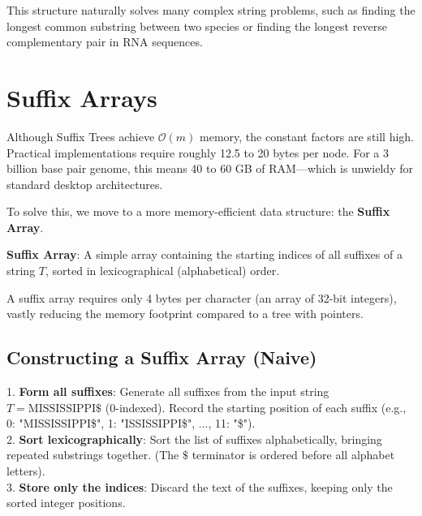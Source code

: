 This structure naturally solves many complex string problems, such as finding the longest common substring between two species or finding the longest reverse complementary pair in RNA sequences.

\section{Suffix Arrays}

Although Suffix Trees achieve \(\mathcal{O}(m)\) memory, the constant factors are still high. Practical implementations require roughly 12.5 to 20 bytes per node. For a 3 billion base pair genome, this means 40 to 60 GB of RAM—which is unwieldy for standard desktop architectures.

To solve this, we move to a more memory-efficient data structure: the \textbf{Suffix Array}.

\begin{important}
    \textbf{Suffix Array}: A simple array containing the starting indices of all suffixes of a string \(T\), sorted in lexicographical (alphabetical) order.
\end{important}

A suffix array requires only 4 bytes per character (an array of 32-bit integers), vastly reducing the memory footprint compared to a tree with pointers.

\subsection{Constructing a Suffix Array (Naive)}

1. \textbf{Form all suffixes}: Generate all suffixes from the input string \(T = \text{MISSISSIPPI\$}\) (0-indexed). Record the starting position of each suffix (e.g., 0: "MISSISSIPPI\$", 1: "ISSISSIPPI\$", ..., 11: "\$").\\
2. \textbf{Sort lexicographically}: Sort the list of suffixes alphabetically, bringing repeated substrings together. (The \(\$\) terminator is ordered before all alphabet letters).\\
3. \textbf{Store only the indices}: Discard the text of the suffixes, keeping only the sorted integer positions.

